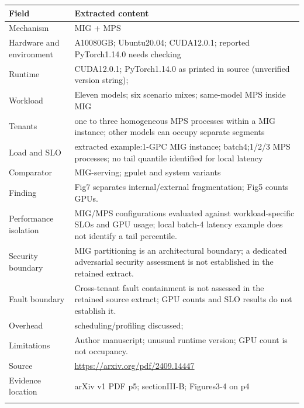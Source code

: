 \cite{P011}

\begin{longtable}{>{\raggedright\arraybackslash}p{}>{\raggedright\arraybackslash}p{}}
\toprule
\textbf{Field} & \textbf{Extracted content}\\\midrule\endhead
Mechanism & MIG + MPS\\\addlinespace
Hardware and environment & A10080GB; Ubuntu20.04; CUDA12.0.1; reported PyTorch1.14.0 needs checking\\\addlinespace
Runtime & CUDA12.0.1; PyTorch1.14.0 as printed in source (unverified version string);\\\addlinespace
Workload & Eleven models; six scenario mixes; same-model MPS inside MIG\\\addlinespace
Tenants & one to three homogeneous MPS processes within a MIG instance; other models can occupy separate segments\\\addlinespace
Load and SLO & extracted example:1-GPC MIG instance; batch4;1/2/3 MPS processes; no tail quantile identified for local latency\\\addlinespace
Comparator & MIG-serving; gpulet and system variants\\\addlinespace
Finding & Fig7 separates internal/external fragmentation; Fig5 counts GPUs.\\\addlinespace
Performance isolation & MIG/MPS configurations evaluated against workload-specific SLOs and GPU usage; local batch-4 latency example does not identify a tail percentile.\\\addlinespace
Security boundary & MIG partitioning is an architectural boundary; a dedicated adversarial security assessment is not established in the retained extract.\\\addlinespace
Fault boundary & Cross-tenant fault containment is not assessed in the retained source extract; GPU counts and SLO results do not establish it.\\\addlinespace
Overhead & scheduling/profiling discussed;\\\addlinespace
Limitations & Author manuscript; unusual runtime version; GPU count is not occupancy.\\\addlinespace
Source & \url{https://arxiv.org/pdf/2409.14447}\\\addlinespace
Evidence location & arXiv v1 PDF p5; sectionIII-B; Figures3-4 on p4\\\addlinespace
\bottomrule\end{longtable}

